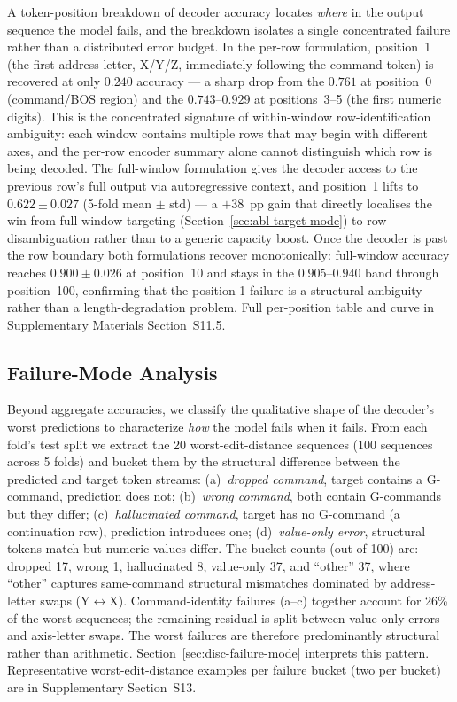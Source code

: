 \documentclass[sensors,article,submit,moreauthors,pdftex]{Definitions/mdpi}
\begin{document}
A token-position breakdown of decoder accuracy locates \emph{where} in the output sequence the model fails, and the breakdown isolates a single concentrated failure rather than a distributed error budget. In the per-row formulation, position~1 (the first address letter, X/Y/Z, immediately following the command token) is recovered at only $0.240$ accuracy --- a sharp drop from the $0.761$ at position~0 (command/BOS region) and the $0.743$--$0.929$ at positions~3--5 (the first numeric digits). This is the concentrated signature of within-window row-identification ambiguity: each window contains multiple rows that may begin with different axes, and the per-row encoder summary alone cannot distinguish which row is being decoded. The full-window formulation gives the decoder access to the previous row's full output via autoregressive context, and position~1 lifts to $0.622 \pm 0.027$ (5-fold mean $\pm$ std) --- a $+38$~pp gain that directly localises the win from full-window targeting (Section~\ref{sec:abl-target-mode}) to row-disambiguation rather than to a generic capacity boost. Once the decoder is past the row boundary both formulations recover monotonically: full-window accuracy reaches $0.900 \pm 0.026$ at position~10 and stays in the $0.905$--$0.940$ band through position~100, confirming that the position-1 failure is a structural ambiguity rather than a length-degradation problem. Full per-position table and curve in Supplementary Materials Section~S11.5.

\subsection{Failure-Mode Analysis}
\label{sec:failure-modes}

Beyond aggregate accuracies, we classify the qualitative shape of the decoder's worst predictions to characterize \emph{how} the model fails when it fails. From each fold's test split we extract the 20 worst-edit-distance sequences (100 sequences across 5 folds) and bucket them by the structural difference between the predicted and target token streams: (a)~\emph{dropped command}, target contains a G-command, prediction does not; (b)~\emph{wrong command}, both contain G-commands but they differ; (c)~\emph{hallucinated command}, target has no G-command (a continuation row), prediction introduces one; (d)~\emph{value-only error}, structural tokens match but numeric values differ. The bucket counts (out of 100) are: dropped 17, wrong 1, hallucinated 8, value-only 37, and ``other'' 37, where ``other'' captures same-command structural mismatches dominated by address-letter swaps (Y$\leftrightarrow$X). Command-identity failures (a--c) together account for 26\% of the worst sequences; the remaining residual is split between value-only errors and axis-letter swaps. The worst failures are therefore predominantly structural rather than arithmetic. Section~\ref{sec:disc-failure-mode} interprets this pattern. Representative worst-edit-distance examples per failure bucket (two per bucket) are in Supplementary Section~S13.
\end{document}
